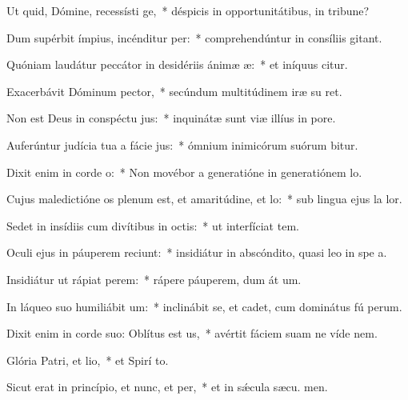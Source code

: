 \item Ut quid, Dómine, recessísti ge,~* déspicis in opportunitátibus, in tribune?
\item Dum supérbit ímpius, incénditur per:~* comprehendúntur in consíliis  gitant.
\item Quóniam laudátur peccátor in desidériis ánimæ æ:~* et iníquus citur.
\item Exacerbávit Dóminum pector,~* secúndum multitúdinem iræ su  ret.
\item Non est Deus in conspéctu jus:~* inquinátæ sunt viæ illíus in  pore.
\item Auferúntur judícia tua a fácie jus:~* ómnium inimicórum suórum bitur.
\item Dixit enim in corde o:~* Non movébor a generatióne in generatiónem  lo.
\item Cujus maledictióne os plenum est, et amaritúdine, et lo:~* sub lingua ejus la  lor.
\item Sedet in insídiis cum divítibus in octis:~* ut interfíciat tem.
\item Oculi ejus in páuperem reciunt:~* insidiátur in abscóndito, quasi leo in spe a.
\item Insidiátur ut rápiat perem:~* rápere páuperem, dum át um.
\item In láqueo suo humiliábit um:~* inclinábit se, et cadet, cum dominátus fú perum.
\item Dixit enim in corde suo: Oblítus est us,~* avértit fáciem suam ne víde  nem.
\item Glória Patri, et lio,~* et Spirí to.
\item Sicut erat in princípio, et nunc, et per,~* et in sǽcula sæcu. men.
